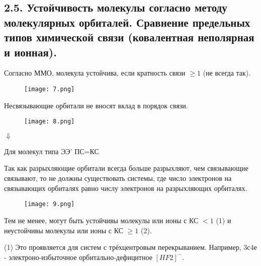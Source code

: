 
\subsection{2.5. Устойчивость молекулы согласно методу молекулярных орбиталей. Сравнение предельных типов химической связи (ковалентная неполярная и ионная).} 

\par\bigskip

Согласно ММО, молекула устойчива, если кратность связи $\geq1$ (не всегда так).
	
\par\smallskip

\begin{figure}[H]
	\centering
	{\texttt{[image: 7.png]}}

\end{figure}

\par\smallskip
Несвязывающие орбитали не вносят вклад в порядок связи.
\par\smallskip


\begin{figure}[H]
	\centering
	{\texttt{[image: 8.png]}}
\end{figure}

\begin{center}
$\Downarrow$

\par\smallskip
Для молекул типа ЭЭ’ ПС=КС

\end{center}


Так как разрыхляющие орбитали всегда больше разрыхляют,
чем связывающие связывают, то не должны существовать
системы, где число электронов на связывающих орбиталях
равно числу электронов на разрыхляющих орбиталях.

\par\smallskip

\begin{figure}[H]
	\centering
	{\texttt{[image: 9.png]}}
\end{figure}

\par\smallskip

Тем не менее, могут быть устойчивы молекулы или ионы с КС $<1$ (1)
и неустойчивы молекулы или ионы с КС $\geq1$ (2).

\par\smallskip

(1) Это проявляется для систем с трёхцентровым перекрыванием.
Например, $3с4е$ - электроно-избыточное орбитально-дефицитное
$[HF2]^-$.

